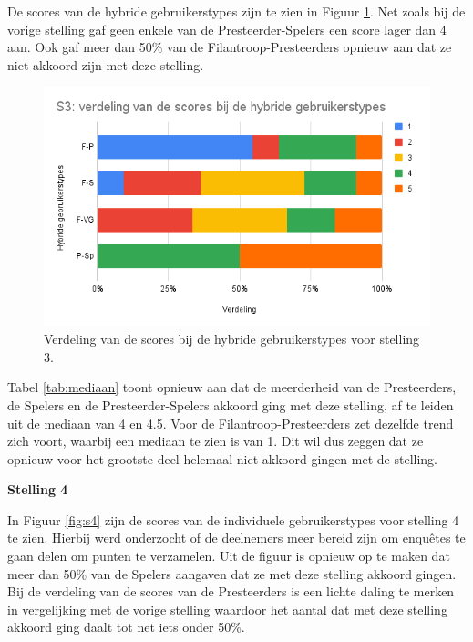 De scores van de hybride gebruikerstypes zijn te zien in Figuur \ref{fig:s3_hybride}. Net zoals bij de vorige stelling gaf geen enkele van de Presteerder-Spelers een score lager dan 4 aan. Ook gaf meer dan 50\% van de Filantroop-Presteerders opnieuw aan dat ze niet akkoord zijn met deze stelling.

\begin{figure}
    \includegraphics[width=\linewidth]{S3_Hybride.png}
    \caption{Verdeling van de scores bij de hybride gebruikerstypes voor stelling 3.}
    \label{fig:s3_hybride}
\end{figure}

Tabel \ref{tab:mediaan} toont opnieuw aan dat de meerderheid van de Presteerders, de Spelers en de Presteerder-Spelers akkoord ging met deze stelling, af te leiden uit de mediaan van 4 en 4.5. Voor de Filantroop-Presteerders zet dezelfde trend zich voort, waarbij een mediaan te zien is van 1. Dit wil dus zeggen dat ze opnieuw voor het grootste deel helemaal niet akkoord gingen met de stelling.

\textbf{Stelling 4}

In Figuur \ref{fig:s4} zijn de scores van de individuele gebruikerstypes voor stelling 4 te zien. Hierbij werd onderzocht of de deelnemers meer bereid zijn om enquêtes te gaan delen om punten te verzamelen. Uit de figuur is opnieuw op te maken dat meer dan 50\% van de Spelers aangaven dat ze met deze stelling akkoord gingen. Bij de verdeling van de scores van de Presteerders is een lichte daling te merken in vergelijking met de vorige stelling waardoor het aantal dat met deze stelling akkoord ging daalt tot net iets onder 50\%.

